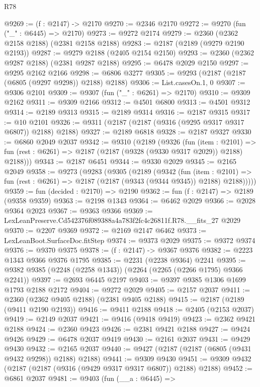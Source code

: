 \begin{lexlean}{R78}
\begin{coremodule}
@9269 := (f : @2147) -> @2170
@9270 := @2346 @2170
@9272 := @9270 (fun ("_" : @6445) => @2170)
@9273 := @9272 @2174
@9279 := @2360 (@2362 @2158 @2188) (@2381 @2158 @2188)
@9283 := @2187 (@2189 (@9279 @2190 @2193))
@9287 := @9279 @2188 (@2405 @2154 @2150)
@9293 := @2360 (@2362 @9287 @2188) (@2381 @9287 @2188)
@9295 := @6478 @2029 @2150
@9297 := @9295 @2162 @2166
@9298 := @6806 @3277
@9305 := @9293 (@2187 (@2187 (@6805 (@9297 @9298)) @2188) @2188)
@9306 := List.casesOn.{1, 0}
@9307 := @9306 @2101
@9309 := @9307 (fun ("_" : @6261) => @2170)
@9310 := @9309 @2162
@9311 := @9309 @2166
@9312 := @4501 @6800
@9313 := @4501 @9312
@9314 := @2189 @9313
@9315 := @2189 @9314
@9316 := @2187 @9315
@9317 := @10 @2101
@9326 := @9311 (@2187 (@2187 (@9316 (@9295 @9317 @9317 @6807)) @2188) @2188)
@9327 := @2189 @6818
@9328 := @2187 @9327
@9330 := @6860 @2049 @2037
@9342 := @9310
    (@2189
      (@9326
        (fun (item : @2101) =>
        fun (rest : @6261) => @2187 (@2187 (@9328 (@9330 @9317 @2029)) @2188) @2188)))
@9343 := @2187 @6451
@9344 := @9330 @2029
@9345 := @2165 @2049
@9358 := @9273
    (@9283
      (@9305
        (@2189
          (@9342
            (fun (item : @2101) =>
            fun (rest : @6261) => @2187 (@2187 (@9343 (@9344 @9345)) @2188) @2188)))))
@9359 := fun (decided : @2170) => @2190
@9362 := fun (f : @2147) => @2189 (@9358 @9359)
@9363 := @2198 @1343
@9364 := @6462 @2029
@9366 := @2028 @9364 @2023
@9367 := @9363 @9366
@9369 := LexLeanPreserve.Cd542376f089388a4a783f2fc4c26811f.R78.__fits_27 @2029
@9370 := @2207 @9369
@9372 := @2169 @2147 @6462
@9373 := LexLeanBoot.SurfaceDoc.fitStep
@9374 := @9373 @2029
@9375 := @9372 @9374
@9376 := @9370 @9375
@9378 := (f : @2147) -> @9367 @9376
@9382 := @2223 @1343 @9366 @9376 @1795
@9385 := @2231 (@2238 @9364) @2241
@9395 := @9382 @9385 (@2248 (@2258 @1343)) (@2264 (@2265 (@2266 @1795) @9366 @2241))
@9397 := @2693 @6445 @2197
@9403 := @9397 @9385 @1306 @1699 @1793 @2188 @2172
@9404 := @9272 @2029
@9405 := @2157 @2037
@9411 := @2360 (@2362 @9405 @2188) (@2381 @9405 @2188)
@9415 := @2187 (@2189 (@9411 @2190 @2193))
@9416 := @9411 @2188
@9418 := @2405 (@2153 @2037)
@9419 := @2149 @2037
@9421 := @9416 (@9418 @9419)
@9423 := @2362 @9421 @2188
@9424 := @2360 @9423
@9426 := @2381 @9421 @2188
@9427 := @9424 @9426
@9429 := @6478 @2037 @9419
@9430 := @2161 @2037
@9431 := @9429 @9430
@9432 := @2165 @2037
@9440 := @9427 (@2187 (@2187 (@6805 (@9431 @9432 @9298)) @2188) @2188)
@9441 := @9309 @9430
@9451 := @9309 @9432 (@2187 (@2187 (@9316 (@9429 @9317 @9317 @6807)) @2188) @2188)
@9452 := @6861 @2037
@9481 := @9403
    (fun (__a : @6445) =>

\end{coremodule}
\end{lexlean}
